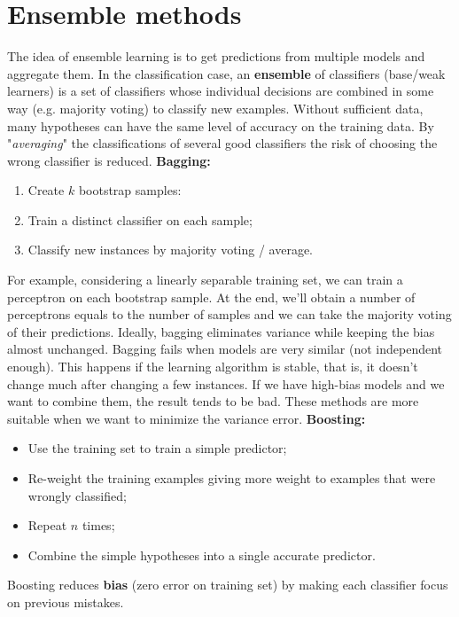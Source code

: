 \section{Ensemble methods}
The idea of ensemble learning is to get predictions from multiple models and aggregate them. In the classification case, an \textbf{ensemble} of classifiers (base/weak learners) is a set of classifiers whose individual decisions are combined in some way (e.g. majority voting) to classify new examples. Without sufficient data, many hypotheses can have the same level of accuracy on the training data. By "\textit{averaging}" the classifications of several good classifiers the risk of choosing the wrong classifier is reduced.\newline\newline
\textbf{Bagging:}
\begin{enumerate}
    \item Create $k$ bootstrap samples:
    \item Train a distinct classifier on each sample;
    \item Classify new instances by majority voting / average.
\end{enumerate}
For example, considering a linearly separable training set, we can train a perceptron on each bootstrap sample. At the end, we'll obtain a number of perceptrons equals to the number of samples and we can take the majority voting of their predictions.\newline\newline
Ideally, bagging eliminates variance while keeping the bias almost unchanged. Bagging fails when models are very similar (not independent enough). This happens if the learning algorithm is stable, that is, it doesn't change much after changing a few instances. If we have high-bias models and we want to combine them, the result tends to be bad. These methods are more suitable when we want to minimize the variance error.\newline\newline
\textbf{Boosting:}
\begin{itemize}
    \item Use the training set to train a simple predictor;
    \item Re-weight the training examples giving more weight to examples that were wrongly classified;
    \item Repeat $n$ times;
    \item Combine the simple hypotheses into a single accurate predictor.
\end{itemize}
Boosting reduces \textbf{bias} (zero error on training set) by making each classifier focus on previous mistakes.
